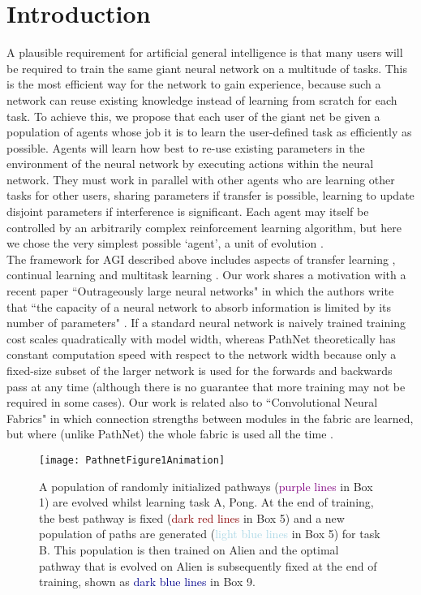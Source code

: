\documentclass{sig-alternate-05-2015}
\begin{document}
\section{Introduction}
A plausible requirement for artificial general intelligence is that many users will be required to train the same giant neural network on a multitude of tasks. This is the most efficient way for the network to gain experience, because such a network can reuse existing knowledge instead of learning from scratch for each task. To achieve this, we propose that each user of the giant net be given a population of agents whose job it is to learn the user-defined task as efficiently as possible. Agents will learn how best to re-use existing parameters in the environment of the neural network by executing actions within the neural network. They must work in parallel with other agents who are learning other tasks for other users, sharing parameters if transfer is possible, learning to update disjoint parameters if interference is significant. Each agent may itself be controlled by an arbitrarily complex reinforcement learning algorithm, but here we chose the very simplest possible `agent', a unit of evolution \cite{fernando2011evolvable}.\\

The framework for AGI described above includes aspects of transfer learning \cite{taylor2011introduction}, continual learning \cite{ring1994continual} and multitask learning \cite{caruana1998multitask}. Our work shares a motivation with a recent paper ``Outrageously large neural networks" in which the authors write that ``the capacity of a neural network to absorb information is limited by its number of parameters" \cite{outrage}. If a standard neural network is naively trained training cost scales quadratically with model width, whereas PathNet theoretically has constant computation speed with respect to the network width because only a fixed-size subset of the larger network is used for the forwards and backwards pass at any time (although there is no guarantee that more training may not be required in some cases). Our work is related also to ``Convolutional Neural Fabrics" in which connection strengths between modules in the fabric are learned, but where (unlike PathNet) the whole fabric is used all the time \cite{saxena2016convolutional}. \\
 
\begin{figure*}[h]
\centering
\texttt{[image: PathnetFigure1Animation]}
\caption{A population of randomly initialized pathways (\textcolor{purple}{purple lines} in Box 1) are evolved whilst learning task A, Pong. At the end of training, the best pathway is fixed (\textcolor{darkred}{dark red lines} in Box 5) and a new population of paths are generated (\textcolor{lightblue}{light blue lines} in Box 5) for task B. This population is then trained on Alien and the optimal pathway that is evolved on Alien is subsequently fixed at the end of training, shown as \textcolor{darkblue}{dark blue lines} in Box 9.}
\label{fig:7}
\end{figure*}
\end{document}
